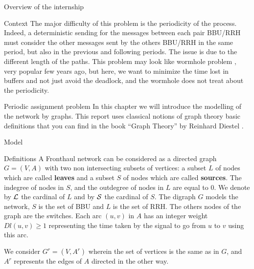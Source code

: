 \documentclass[a4paper,10pt]{report}
\begin{document}
\begin{chapter}{Overview of the internship}
\begin{section}{Context}
The major difficulty of this problem is the periodicity of the process. Indeed, a deterministic sending for the messages
between each pair BBU/RRH must consider the other messages sent by the others BBU/RRH in the same period, but also in the previous
and following periods. The issue is due to the different length of the paths. This problem may look like wormhole problem \cite{cole1996benefit}, very popular few years ago, but here, we want to minimize the time lost in buffers and not just avoid the deadlock, and the wormhole does not treat about the periodicity.
\end{section}

\end{chapter}

\begin{chapter}{Periodic assignment problem}
 In this chapter we will introduce the modelling of the network by graphs. This report uses classical notions of graph theory basic definitions that you can find in the book ``Graph Theory'' by Reinhard Diestel \cite{diestel2005graph}.
 \begin{section}{Model}
 \begin{subsection}{Definitions}
  A Fronthaul network can be considered as a directed graph $G=(V,A)$ with two non intersecting subsets of vertices: 
  a subset $L$ of nodes which are called {\bf leaves} and a subset $S$ of nodes which are called {\bf sources}.  
The indegree of nodes in $S$, and the outdegree of nodes in $L$ are equal to 0. 
We denote by ${\cal L}$ the cardinal of $L$ and by ${\cal S}$ the cardinal of $S$. The digraph $G$ models the network,
$S$ is the set of BBU and $L$ is the set of RRH. The others nodes of the graph are the switches.
Each arc  $(u,v)$ in $A$ has an integer weight $Dl(u,v) \geq 1$ representing the time taken by the signal to go from $u$ to $v$
 using this arc.

We consider $G^r=(V,A^r)$ wherein the set of vertices is the same as in $G$, and $A^r$ represents the edges of $A$ directed in the other way. 
\newline
\begin{center}
\end{center}
\end{subsection}
\end{section}
\end{chapter}
\end{document}
